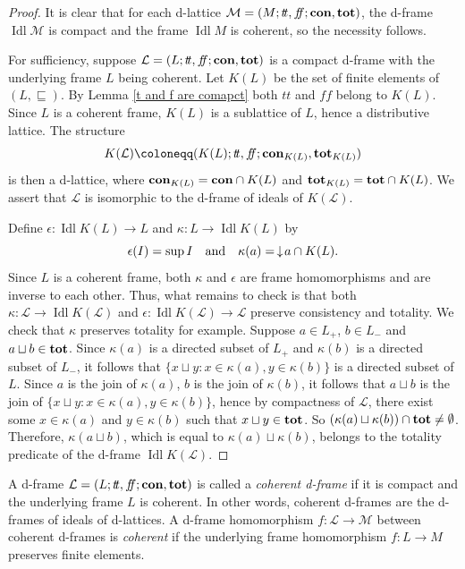 \documentclass[11pt]{article}
\DeclareMathOperator{\idl}{Idl}
\theoremstyle{plain}
\theoremstyle{definition}
\newcommand{\dbt}{{t\!t}}
\newcommand{\dbf}{{f\!\!f}}
\newcommand{\lra}{\longrightarrow}
\begin{document}
\begin{proof} It is clear that for each d-lattice $\mathcal{M}=(M;\dbt,\dbf;{\bf con},{\bf tot})$, the d-frame $\idl\mathcal{M}$ is compact and the frame $\idl M$ is coherent, so the necessity follows.

For sufficiency, suppose $\mathcal{L}=(L;\dbt,\dbf;{\bf con},{\bf tot})$ is a compact d-frame with the underlying frame $L$ being coherent. Let $K(L)$ be the set of finite elements of $(L,\sqsubseteq)$. By Lemma \ref{t and f are comapct} both $\dbt$ and $\dbf$ belong to $K(L)$.  Since $L$ is a coherent frame, $K(L)$ is a sublattice of $L$, hence a distributive lattice. The  structure $$K(\mathcal{L})\coloneqq (K(L);\dbt,\dbf;{\bf con}_{K(L)},{\bf tot}_{K(L)})$$ is then a d-lattice, where   ${\bf con}_{K(L)}={\bf con}\cap K(L)$ and ${\bf tot}_{K(L)}={\bf tot}\cap K(L)$. We assert that  $\mathcal{L}$ is isomorphic to the d-frame of ideals of $K(\mathcal{L})$.
  
Define $\epsilon\colon \idl K(L)\longrightarrow L$ and $\kappa\colon L\longrightarrow\idl K(L)$  by
$$\epsilon(I)=\sup I \quad\text{and}\quad \kappa(a)=\thinspace \downarrow\! a\cap K(L). $$
Since $L$ is a coherent frame, both $\kappa$ and $\epsilon$ are frame homomorphisms and are inverse to each other.
Thus, what remains to check is that both $\kappa\colon \mathcal{L}\lra \idl K(\mathcal{L})$ and $\epsilon\colon  \idl K(\mathcal{L})\lra\mathcal{L} $ preserve consistency and totality. We check that $\kappa$ preserves totality for example. Suppose $a\in L_+$, $b\in L_-$ and $a\sqcup b\in{\bf tot}$. Since $\kappa(a)$  is a directed subset of $L_+$ and $\kappa(b)$ is a directed subset of $L_-$, it follows that  $\{x\sqcup y :x\in\kappa(a), y\in\kappa(b)\}$ is a directed subset of $L$. Since $a$ is the join of $\kappa(a)$, $b$ is the join of $\kappa(b)$, it follows that $a\sqcup b$ is the join of $ \{x\sqcup y:x\in\kappa(a),y\in\kappa(b)\}$, hence  
by compactness of $\mathcal{L}$, there exist some $x\in\kappa(a)$ and $y\in\kappa(b)$ such that $x\sqcup y\in{\bf tot}$. So  $(\kappa(a)\sqcup\kappa(b))\cap {\bf tot}\neq\emptyset$. Therefore, $\kappa(a\sqcup b)$, which is equal to $\kappa(a)\sqcup\kappa(b)$, belongs to the totality predicate of the d-frame $\idl K(\mathcal{L})$. \end{proof}

A d-frame  $\mathcal{L}=(L;\dbt,\dbf;{\bf con},{\bf tot})$ is called a \emph{coherent d-frame} if it is compact and the underlying frame $L$ is coherent. In other words, coherent d-frames are the d-frames of ideals of d-lattices. A d-frame homomorphism $f\colon \mathcal{L}\lra\mathcal{M}$ between coherent d-frames is  \emph{coherent} if the underlying frame homomorphism $f\colon L\lra M$   preserves finite elements. 
\end{document}
